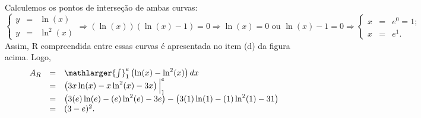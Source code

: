 \cleardoublepage\documentclass[../main.tex]{subfiles}
\begin{document}
\begin{exeresol}
\begin{compactenum}[a)]
\begin{solution}
Calculemos os pontos de interseção de ambas curvas:
\[ \left\{ \begin{array}{ccl} y&=& \ln(x)\\ y&=& \ln^2(x) \end{array} \right. \Rightarrow (\ln(x) )(\ln(x) -1) =0 \Rightarrow \ln(x) =0\,\,\mbox{ou}\,\,\ln(x) -1 =0 \Rightarrow \left\{ \begin{array}{ccl} x&=&e^0=1;\\ x&=&e^1. \end{array} \right. \]
Assim, R compreendida entre essas curvas é apresentada no item (d) da figura acima. Logo,
\[ \begin{array}{rcl} A_R &= &\mathlarger{\int}^{e}_{1} \left( \ln(x) -\ln^2(x) \right)dx \\ & = & \left( 3x\ln (x) -x\ln^2 (x) -3x \right)\Big{|}^{e}_{1} \\ & = & \left( 3(e)\ln (e) -(e)\ln^2 (e) -3e \right)-\left( 3(1)\ln (1) -(1)\ln^2 (1) -31 \right)\\ & = & (3-e) ^2. \end{array} \]
\end{solution}
\end{compactenum}
\end{exeresol}
\end{document}
